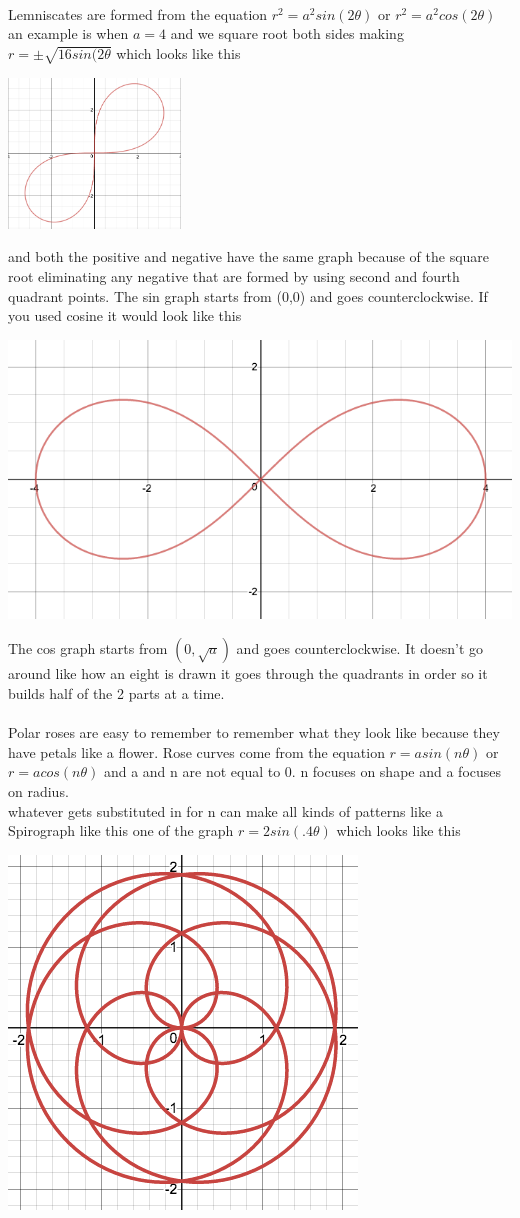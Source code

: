 \documentclass[a4paper,openright, 14pt]{article}
\begin{document}
\\Lemniscates are formed from the equation $r^2=a^2sin(2\theta)$ or $r^2=a^2cos(2\theta)$ an example is when $a=4$ and we square root both sides making $r=\pm \sqrt{16sin(2\theta}$ which looks like this \begin{center}
    

\includegraphics[width = 5 cm, height = 4cm]{sin.png}
\end{center}and both the positive and negative have the same graph because of the square root eliminating any negative that are formed by using second and fourth quadrant points. The sin graph starts from (0,0) and goes counterclockwise. If you used cosine it would look like this \begin{center}
    

\includegraphics[width = 5 cm, height = 3.5 cm]{cos.png}
\end{center}
The cos graph starts from $(0,\sqrt{a})$ and goes counterclockwise. It doesn't go around like how an eight is drawn it goes through the quadrants in order so it builds half of the 2 parts at a time.
\\
\\Polar roses are easy to remember to remember what they look like because they have petals like a flower. Rose curves come from the equation $r=asin(n\theta)$ or $r=acos(n\theta)$ and a and n are not equal to 0. n focuses on shape and a focuses on radius. 
\\whatever gets substituted in for n
can make all kinds of patterns like a Spirograph like this one of the graph $r=2sin(.4\theta)$ which looks like this
\begin{center}
    

\includegraphics[width = 5 cm, height = 5 cm]{shape.png}
\end{center}
\end{document}
